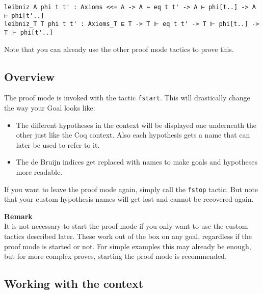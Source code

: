 \documentclass[12pt, a4paper]{article}
\newcommand{\remark}[1]{
	\vspace{3pt}
	\begin{boxremark}
		\parbox{\textwidth}{\textbf{Remark}\\#1}
	\end{boxremark}}
\begin{document}
\begin{verbatim}
leibniz A phi t t' : Axioms <<= A -> A ⊢ eq t t' -> A ⊢ phi[t..] -> A ⊢ phi[t'..]
leibniz_T T phi t t' : Axioms_T ⊑ T -> T ⊩ eq t t' -> T ⊩ phi[t..] -> T ⊩ phi[t'..]
\end{verbatim}
Note that you can already use the other proof mode tactics to prove this.

\subsection{Overview}

The proof mode is invoked with the tactic \texttt{fstart}. This will drastically change the way your Goal looks like:
\begin{itemize}
	\item 
	The different hypotheses in the context will be displayed one underneath the other just like the Coq context.
	Also each hypothesis gets a name that can later be used to refer to it.
	
	\item 
	The de Bruijn indices get replaced with names to make goals and hypotheses more readable.
\end{itemize}
If you want to leave the proof mode again, simply call the \texttt{fstop} tactic.
But note that your custom hypothesis names will get lost and cannot be recovered again.

\remark{It is not necessary to start the proof mode if you only want to use the custom tactics described later. These work out of the box on any goal, regardless if the proof mode is started or not. For simple examples this may already be enough, but for more complex proves, starting the proof mode is recommended.}


\subsection{Working with the context}
\end{document}
